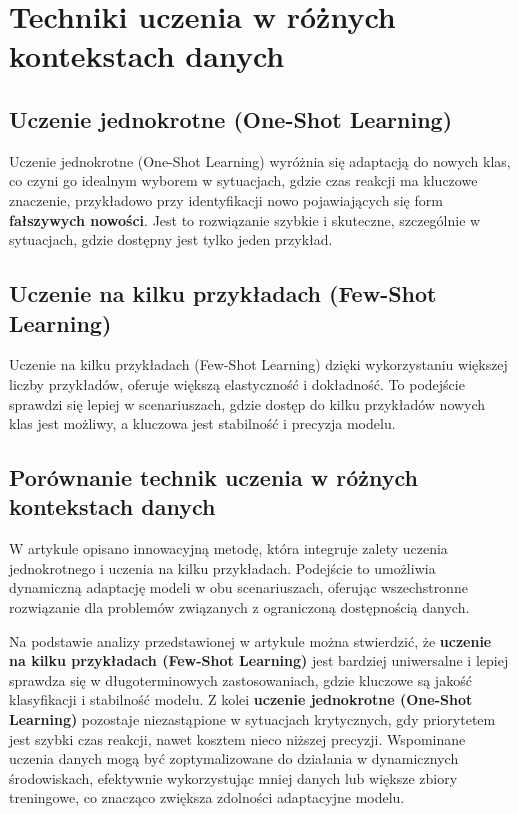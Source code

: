 \section{Techniki uczenia w różnych kontekstach danych}
\subsection{Uczenie jednokrotne (One-Shot Learning)}
Uczenie jednokrotne (One-Shot Learning) wyróżnia się adaptacją do nowych klas, co
czyni go idealnym wyborem w sytuacjach, gdzie czas reakcji ma kluczowe
znaczenie, przykładowo przy identyfikacji nowo pojawiających się form \textbf{fałszywych nowości}.
Jest to rozwiązanie szybkie i skuteczne, szczególnie w sytuacjach, gdzie
dostępny jest tylko jeden przykład.

\subsection{Uczenie na kilku przykładach (Few-Shot Learning)}
Uczenie na kilku przykładach (Few-Shot Learning) dzięki wykorzystaniu większej liczby przykładów, oferuje
większą elastyczność i dokładność. To podejście sprawdzi się lepiej w
scenariuszach, gdzie dostęp do kilku przykładów nowych klas jest
możliwy, a kluczowa jest stabilność i precyzja modelu.

\subsection{Porównanie technik uczenia w różnych kontekstach danych}
W artykule \cite{articleUnified} opisano innowacyjną metodę, która integruje zalety uczenia jednokrotnego i uczenia na kilku przykładach. Podejście to umożliwia dynamiczną adaptację modeli w obu scenariuszach, oferując wszechstronne rozwiązanie dla problemów związanych z ograniczoną dostępnością danych.

Na podstawie analizy przedstawionej w artykule można stwierdzić, że \textbf{uczenie na kilku przykładach (Few-Shot Learning)} jest bardziej uniwersalne i lepiej sprawdza się w długoterminowych zastosowaniach, gdzie kluczowe są jakość klasyfikacji i stabilność modelu. Z kolei \textbf{uczenie jednokrotne (One-Shot Learning)} pozostaje niezastąpione w sytuacjach krytycznych, gdy priorytetem jest szybki czas reakcji, nawet kosztem nieco niższej precyzji. Wspominane uczenia danych mogą być zoptymalizowane do działania w dynamicznych środowiskach, efektywnie wykorzystując mniej danych lub większe zbiory treningowe, co znacząco zwiększa zdolności adaptacyjne modelu.